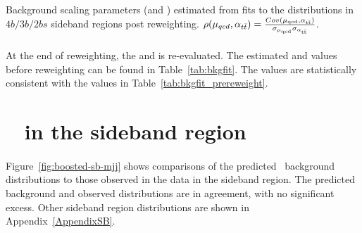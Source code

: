 \begin{table}[htbp!]
\begin{center}
\caption{Background scaling parameters (\muqcd and \alphatt) estimated from fits to the \mleadJ distributions in $4b/3b/2bs$ sideband regions post reweighting. $\rho(\mu_{qcd},\alpha_{t\bar{t}}) = \frac{Cov(\rm \mu_{qcd},\rm \alpha_{\rm t\bar{t}})}{\rm \sigma_{\mu_{qcd}} \rm \sigma_{\alpha_{\rm t\bar{t}}} }$.}

\label{tab:bkgfit}
\end{center}
\end{table}

\paragraph{}
At the end of reweighting, the \muqcd and \alphatt is re-evaluated. The estimated \muqcd and \alphatt values before reweighting can be found in Table~\ref{tab:bkgfit}. 
The values are statistically consistent with the values in Table~\ref{tab:bkgfit_prereweight}.



\section{\mtwoJ~ in the sideband region}
\label{sec:boosted-sb}

\paragraph{}
Figure~\ref{fig:boosted-sb-mjj} shows comparisons of the predicted \mtwoJ~background distributions to those observed in the data in the sideband region.
The predicted background and observed distributions are in agreement, with no significant excess.
Other sideband region distributions are shown in Appendix~\ref{AppendixSB}.

